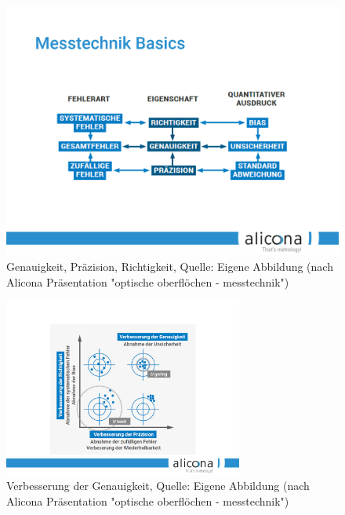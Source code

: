 \begin{figure}[H]
    \centering
    \includegraphics[width=1\textwidth,trim={5cm 8cm 5cm 9cm},clip]{graphics/intro/intro_alicona_basics}
    \caption[Folie]{Genauigkeit, Präzision, Richtigkeit, Quelle: Eigene Abbildung (nach Alicona Präsentation "optische oberflöchen - messtechnik")}
    \label{fig:intro_verbesserung_genauigkeit}
\end{figure}

\begin{figure}[H]
    \centering
    \includegraphics[width=0.7\textwidth,trim={8cm 4cm 8cm 4cm},clip]{graphics/intro/intro_verbesserung_der_genauigkeit}
    \caption[Folie]{Verbesserung der Genauigkeit, Quelle: Eigene Abbildung (nach Alicona Präsentation "optische oberflöchen - messtechnik")}
    \label{fig:intro_verbesserung_genauigkeit}
\end{figure}

